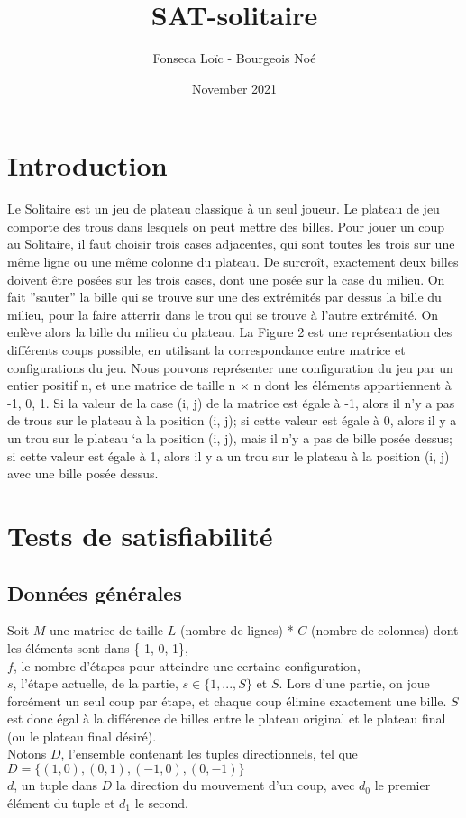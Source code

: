 \documentclass[utf8]{article}
\title{SAT-solitaire}
\author{Fonseca Loïc - Bourgeois Noé}
\date{November 2021}
\begin{document}
\maketitle
\tableofcontents

\newpage


\section{Introduction}
Le Solitaire est un jeu de plateau classique à un seul joueur. 
Le plateau de jeu comporte des trous dans lesquels on peut mettre des billes. 
Pour jouer un coup au Solitaire, il faut choisir trois cases adjacentes, qui sont
toutes les trois sur une même ligne ou une même colonne du plateau. De surcroît,
exactement deux billes doivent être posées sur les trois cases, dont une posée sur
la case du milieu. On fait ”sauter” la bille qui se trouve sur une des extrémités
par dessus la bille du milieu, pour la faire atterrir dans le trou qui se trouve à
l’autre extrémité. On enlève alors la bille du milieu du plateau. La Figure 2 est
une représentation des différents coups possible, en utilisant la correspondance
entre matrice et configurations du jeu. Nous pouvons représenter une configuration du jeu par un entier positif n, et
une matrice de taille n × n dont les éléments appartiennent à {-1, 0, 1}. Si la
valeur de la case (i, j) de la matrice est égale à -1, alors il n’y a pas de trous
sur le plateau à la position (i, j); si cette valeur est égale à 0, alors il y a un
trou sur le plateau `a la position (i, j), mais il n’y a pas de bille posée dessus; 
si cette valeur est égale à 1, alors il y a un trou sur le plateau à la position (i, j) avec une bille posée dessus.

\section{Tests de satisfiabilité}
\subsection{ Données générales}
Soit $M$ une matrice de taille $L$ (nombre de lignes) * $C$ (nombre de colonnes)
dont les éléments sont dans \{-1, 0, 1\},
\\$f$, le nombre d'étapes pour atteindre une certaine configuration,
\label{nbEtapes}
\\$s$, l'étape actuelle, de la partie, $s\in \{1,...,S\}$ et $S$. Lors d'une partie, on joue forcément un seul coup par étape, et chaque coup élimine exactement une bille. $S$ est donc égal à la différence de billes entre le plateau original et le plateau final (ou le plateau final désiré).
\\Notons $D$, l'ensemble contenant les tuples directionnels, tel que $D=\{(1,0),(0,1),(-1,0),(0,-1)\}$
\\$d$, un tuple dans $D$ la direction du mouvement d'un coup, avec $d_0$ le premier élément du tuple et $d_1$ le second.
\end{document}
